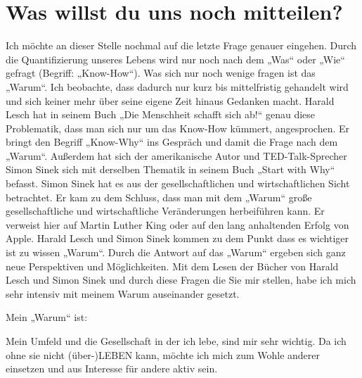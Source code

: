 \documentclass[12pt]{scrreprt}
\begin{document}
\section*{Was willst du uns noch mitteilen?}
Ich möchte an dieser Stelle nochmal auf die letzte Frage genauer eingehen. Durch die Quantifizierung
unseres Lebens wird nur noch nach dem „Was“ oder „Wie“ gefragt (Begriff: „Know-How“).
Was sich nur noch wenige fragen ist das „Warum“. Ich beobachte, dass dadurch nur kurz bis
mittelfristig gehandelt wird und sich keiner mehr über seine eigene Zeit hinaus Gedanken macht.
 Harald Lesch hat in seinem Buch „Die Menschheit schafft sich ab!“ genau
diese Problematik, dass man sich nur um das Know-How kümmert, angesprochen. Er bringt den
Begriff „Know-Why“ ins Gespräch und damit die Frage nach dem „Warum“. Außerdem
hat sich der amerikanische Autor und TED-Talk-Sprecher Simon Sinek sich mit derselben Thematik
in seinem Buch „Start with Why“ befasst. Simon Sinek hat es aus der gesellschaftlichen
und wirtschaftlichen Sicht betrachtet. Er kam zu dem Schluss, dass man mit dem „Warum“
große gesellschaftliche und wirtschaftliche Veränderungen herbeiführen kann. Er verweist hier
auf Martin Luther King oder auf den lang anhaltenden Erfolg von Apple.
Harald Lesch und Simon Sinek kommen zu dem Punkt dass es wichtiger ist zu wissen „Warum“.
Durch die Antwort auf das „Warum“ ergeben sich ganz neue Perspektiven und Möglichkeiten.
Mit dem Lesen der Bücher von Harald Lesch und Simon Sinek und durch diese Fragen die Sie
mir stellen, habe ich mich sehr intensiv mit meinem Warum auseinander gesetzt.

Mein „Warum“ ist:

Mein Umfeld und die Gesellschaft in der ich lebe, sind mir sehr wichtig. Da ich ohne sie 
nicht (über-)LEBEN kann, möchte ich mich zum Wohle anderer einsetzen und aus Interesse für andere aktiv sein.
\end{document}
